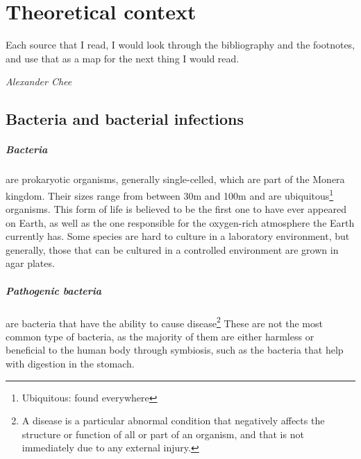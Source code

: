 \chapter{Theoretical context}
\epigraph{Each source that I read, I would look through the bibliography and the footnotes, and use that as a map for the next thing I would read.}{\textit{Alexander Chee}}
\section{Bacteria and bacterial infections}
\paragraph{Bacteria} are prokaryotic organisms, generally single-celled, which are part of the Monera kingdom. Their sizes range from between 30\textmu m and 100\textmu m and are ubiquitous\footnote{Ubiquitous: found everywhere} organisms. This form of life is believed to be the first one to have ever appeared on Earth, as well as the one responsible for the oxygen-rich atmosphere the Earth currently has. Some species are hard to culture in a laboratory environment, but generally, those that can be cultured in a controlled environment are grown in agar plates\cite{murrayMicrobiologiaMedica2013}. \newline
\paragraph{Pathogenic bacteria} are bacteria that have the ability to cause disease\footnote{A disease is a particular abnormal condition that negatively affects the structure or function of all or part of an organism, and that is not immediately due to any external injury\cite{DorlandsMedicalDictionary2010}.} These are not the most common type of bacteria, as the majority of them are either harmless or beneficial to the human body through symbiosis, such as the bacteria that help with digestion in the stomach\cite{murrayMicrobiologiaMedica2013}.
